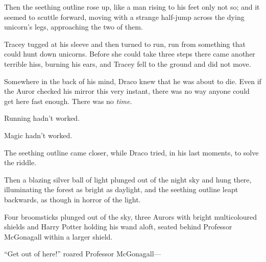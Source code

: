 Then the seething outline rose up, like a man rising to his feet only not so; and it seemed to scuttle forward, moving with a strange half-jump across the dying unicorn’s legs, approaching the two of them.

Tracey tugged at his sleeve and then turned to run, run from something that could hunt down unicorns. Before she could take three steps there came another terrible hiss, burning his ears, and Tracey fell to the ground and did not move.

Somewhere in the back of his mind, Draco knew that he was about to die. Even if the Auror checked his mirror this very instant, there was no way anyone could get here fast enough. There was no \emph{time}.

Running hadn’t worked.

Magic hadn’t worked.

The seething outline came closer, while Draco tried, in his last moments, to solve the riddle.

Then a blazing silver ball of light plunged out of the night sky and hung there, illuminating the forest as bright as daylight, and the seething outline leapt backwards, as though in horror of the light.

Four broomsticks plunged out of the sky, three Aurors with bright multicoloured shields and Harry Potter holding his wand aloft, seated behind Professor McGonagall within a larger shield.

“Get out of here!” roared Professor McGonagall—

